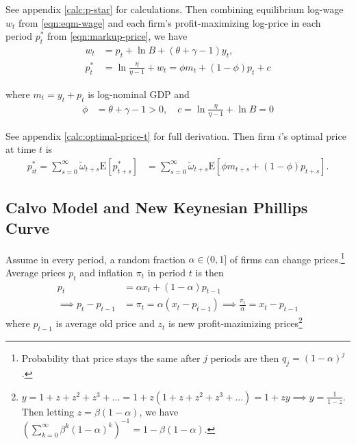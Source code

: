 \documentclass{article}
\newcommand{\E}[1]{\mathrm{E}\left[#1\right]}
\newcommand{\?}{\textcolor{red}{(?)}} %
\begin{document}
        See appendix \eqref{calc:p-star} for calculations. Then combining equilibrium log-wage $w_t$ from \eqref{eqn:eqm-wage} and each firm's profit-maximizing log-price in each period $p_t^*$ from \eqref{eqn:markup-price}, we have
        \begin{align}
            w_t &= p_t + \ln{B} + (\theta + \gamma - 1) y_t,
            \\
            p_t^* &= \ln{\frac{\eta}{\eta - 1}} + w_t
            = \phi m_t + (1-\phi) p_t + c
            \label{eqn:optimal-price-t}
        \end{align}
        
        where $m_t = y_t + p_t$ is log-nominal GDP and
        \begin{align}
            \phi &= \theta + \gamma - 1 > 0, \quad
            c = \ln{\frac{\eta}{\eta - 1}} + \ln{B} = 0
        \end{align}
        
        See appendix \eqref{calc:optimal-price-t} for full derivation. Then firm $i$'s optimal price at time $t$ is
        \begin{align}
            p_{it}^*
            = \sum_{s=0}^\infty \tilde\omega_{t+s} \E{p_{t+s}^*}
            &= \sum_{s=0}^\infty \tilde\omega_{t+s} \E{\phi m_{t+s} + (1-\phi) p_{t+s}}.
        \end{align}
        
    \subsection{Calvo Model and New Keynesian Phillips Curve}
    
        Assume in every period, a random fraction $\alpha \in (0, 1]$ of firms can change prices.\footnote{Probability that price stays the same after $j$ periods are then $q_j = (1-\alpha)^j$.}
        Average prices $p_t$ and inflation $\pi_t$ in period $t$ is then
        \begin{align}
            p_t &= \alpha x_t + (1 - \alpha) p_{t-1}
            \\
            \implies
            p_t - p_{t-1}
            &= \pi_t = \alpha (x_t - p_{t-1})
            \implies
            \frac{\pi_t}{\alpha} = x_t - p_{t-1}
        \end{align}
        where $p_{t-1}$ is average old price and $z_t$ is new profit-mazimizing prices\footnote{$y = 1 + z + z^2 + z^3 + ... = 1 + z(1 + z + z^2 + z^3 + ...) = 1 + zy \implies y = \frac{1}{1-z}$. Then letting $z = \beta(1-\alpha)$, we have $\left(\sum_{k=0}^\infty\beta^k(1-\alpha)^k\right)^{-1} = 1-\beta(1-\alpha)$.}
        
\end{document}
